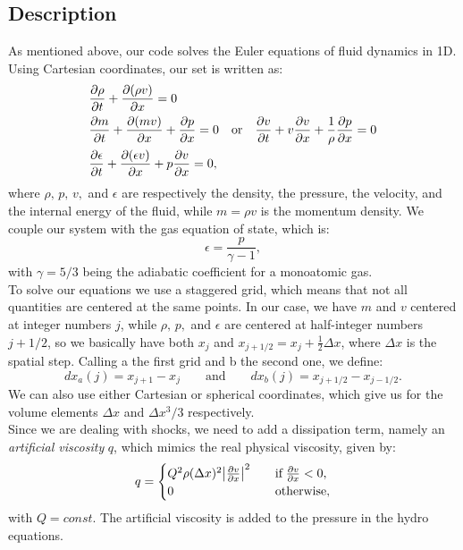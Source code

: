 \documentclass{article}
\begin{document}
\subsection{Description}\label{descrip}
As mentioned above, our code solves the Euler equations of fluid dynamics in 1D. Using Cartesian coordinates, our set is written as:
\begin{align}
	&\pdv{\rho}{t}+\pdv{(\rho v)}{x}=0 \label{eoc}\\
	&\pdv{m}{t}+\pdv{(mv)}{x}+\pdv{p}{x}=0\quad\text{or}\quad\pdv{v}{t}+v\pdv{v}{x}+\frac{1}{\rho}\pdv{p}{x}=0 \label{eom}\\
	&\pdv{\epsilon}{t}+\pdv{(\epsilon v)}{x}+p\pdv{v}{x}=0,\label{eoe}
\end{align}
where $\rho,\, p,\, v,$ and $\epsilon$ are respectively the density, the pressure, the velocity, and the internal energy of the fluid, while $m=\rho v$ is the momentum density. We couple our system with the gas equation of state, which is:
\begin{equation}\label{eqstate}
	\epsilon=\frac{p}{\gamma -1},
\end{equation}
with $\gamma=5/3$ being the adiabatic coefficient for a monoatomic gas.\\
To solve our equations we use a staggered grid, which means that not all quantities are centered at the same points. In our case, we have $m$ and $v$ centered at integer numbers $j$, while $\rho,\,p,$ and $\epsilon$ are centered at half-integer numbers $j+1/2$, so we basically have both $x_{j}$ and $x_{j+1/2}=x_{j}+\frac{1}{2}\Delta x$, where $\Delta x$ is the spatial step. 
Calling a the first grid and b the second one, we define:
\begin{equation*}
	dx_a(j)=x_{j+1}-x_{j} \qquad \text{and} \qquad dx_b(j)=x_{j+1/2}-x_{j-1/2}.
\end{equation*}
We can also use either Cartesian or spherical coordinates, which give us for the volume elements $\Delta x$ and $\Delta x^3/3$ respectively.\\
Since we are dealing with shocks, we need to add a dissipation term, namely an \textit{artificial viscosity} $q$, which mimics the real physical viscosity, given by:
\begin{equation}
	q=
	\begin{cases}
		Q^2 \rho(\Delta x)^2 \abs{\pdv{v}{x}}^2\quad &\text{if} \; \pdv{v}{x}<0,\\
		0 \quad &\text{otherwise},
	\end{cases}
\end{equation} 
with $Q=const$. The artificial viscosity is added to the pressure in the hydro equations.\\
\end{document}
